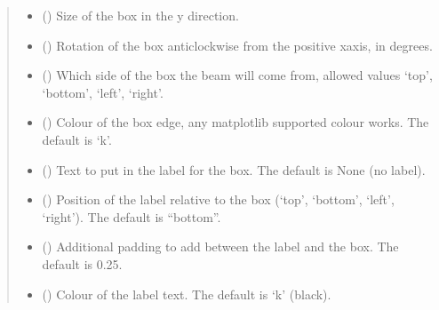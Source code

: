 \documentclass[letterpaper,10pt,english]{sphinxmanual}
\begin{document}
\begin{fulllineitems}
\begin{fulllineitems}
\begin{quote}
\begin{description}
\begin{itemize}
\item {} 
\sphinxAtStartPar
{} () \textendash{} Size of the box in the y direction.

\item {} 
\sphinxAtStartPar
{} () \textendash{} Rotation of the box anticlockwise from the positive x\sphinxhyphen{}axis, in degrees.

\item {} 
\sphinxAtStartPar
{} () \textendash{} Which side of the box the beam will come from, allowed values ‘top’,
‘bottom’, ‘left’, ‘right’.

\item {} 
\sphinxAtStartPar
{} (\sphinxstyleliteralemphasis{\sphinxupquote{, }}) \textendash{} Colour of the box edge, any matplotlib supported colour works. The default is ‘k’.

\item {} 
\sphinxAtStartPar
{} (\sphinxstyleliteralemphasis{\sphinxupquote{, }}) \textendash{} Text to put in the label for the box. The default is None (no label).

\item {} 
\sphinxAtStartPar
{} (\sphinxstyleliteralemphasis{\sphinxupquote{, }}) \textendash{} Position of the label relative to the box (‘top’, ‘bottom’, ‘left’, ‘right’).
The default is “bottom”.

\item {} 
\sphinxAtStartPar
{} (\sphinxstyleliteralemphasis{\sphinxupquote{, }}) \textendash{} Additional padding to add between the label and the box. The default is 0.25.

\item {} 
\sphinxAtStartPar
{} (\sphinxstyleliteralemphasis{\sphinxupquote{, }}) \textendash{} Colour of the label text. The default is ‘k’ (black).


\end{itemize}
\end{description}
\end{quote}
\end{fulllineitems}
\end{fulllineitems}
\end{document}
